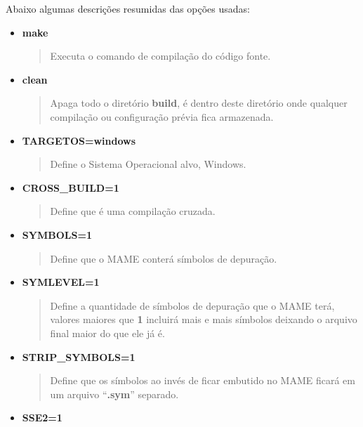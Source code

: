 \documentclass[letterpaper,10pt,brazil]{sphinxmanual}
\begin{document}
Abaixo algumas descrições resumidas das opções usadas:
\begin{itemize}
\item {} 
\textbf{make}
\begin{quote}

Executa o comando de compilação do código fonte.
\end{quote}

\item {} 
\textbf{clean}
\begin{quote}

Apaga todo o diretório \textbf{build}, é dentro deste diretório onde
qualquer compilação ou configuração prévia fica armazenada.
\end{quote}

\item {} 
\textbf{TARGETOS=windows}
\begin{quote}

Define o Sistema Operacional alvo, Windows.
\end{quote}

\item {} 
\textbf{CROSS\_BUILD=1}
\begin{quote}

Define que é uma compilação cruzada.
\end{quote}

\item {} 
\textbf{SYMBOLS=1}
\begin{quote}

Define que o MAME conterá símbolos de depuração.
\end{quote}

\item {} 
\textbf{SYMLEVEL=1}
\begin{quote}

Define a quantidade de símbolos de depuração que o MAME terá,
valores maiores que \textbf{1} incluirá mais e mais símbolos
deixando o arquivo final maior do que ele já é.
\end{quote}

\item {} 
\textbf{STRIP\_SYMBOLS=1}
\begin{quote}

Define que os símbolos ao invés de ficar embutido no MAME ficará
em um arquivo ``\textbf{.sym}'' separado.
\end{quote}

\item {} 
\textbf{SSE2=1}
\begin{quote}


\end{quote}
\end{itemize}
\end{document}
